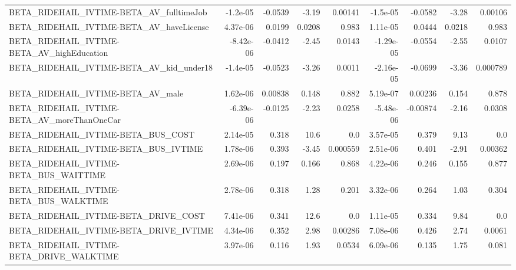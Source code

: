 \begin{tabular}{lrrrrrrrr}
BETA\_RIDEHAIL\_IVTIME-BETA\_AV\_fulltimeJob           &    -1.2e-05 &      -0.0539 &     -3.19 &  0.00141 &   -1.5e-05 &     -0.0582 &        -3.28 &       0.00106 \\
BETA\_RIDEHAIL\_IVTIME-BETA\_AV\_haveLicense           &    4.37e-06 &       0.0199 &    0.0208 &    0.983 &   1.11e-05 &      0.0444 &       0.0218 &         0.983 \\
BETA\_RIDEHAIL\_IVTIME-BETA\_AV\_highEducation         &   -8.42e-06 &      -0.0412 &     -2.45 &   0.0143 &  -1.29e-05 &     -0.0554 &        -2.55 &        0.0107 \\
BETA\_RIDEHAIL\_IVTIME-BETA\_AV\_kid\_under18           &    -1.4e-05 &      -0.0523 &     -3.26 &   0.0011 &  -2.16e-05 &     -0.0699 &        -3.36 &      0.000789 \\
BETA\_RIDEHAIL\_IVTIME-BETA\_AV\_male                  &    1.62e-06 &      0.00838 &     0.148 &    0.882 &   5.19e-07 &     0.00236 &        0.154 &         0.878 \\
BETA\_RIDEHAIL\_IVTIME-BETA\_AV\_moreThanOneCar        &   -6.39e-06 &      -0.0125 &     -2.23 &   0.0258 &  -5.48e-06 &    -0.00874 &        -2.16 &        0.0308 \\
BETA\_RIDEHAIL\_IVTIME-BETA\_BUS\_COST                 &    2.14e-05 &        0.318 &      10.6 &      0.0 &   3.57e-05 &       0.379 &         9.13 &           0.0 \\
BETA\_RIDEHAIL\_IVTIME-BETA\_BUS\_IVTIME               &    1.78e-06 &        0.393 &     -3.45 & 0.000559 &   2.51e-06 &       0.401 &        -2.91 &       0.00362 \\
BETA\_RIDEHAIL\_IVTIME-BETA\_BUS\_WAITTIME             &    2.69e-06 &        0.197 &     0.166 &    0.868 &   4.22e-06 &       0.246 &        0.155 &         0.877 \\
BETA\_RIDEHAIL\_IVTIME-BETA\_BUS\_WALKTIME             &    2.78e-06 &        0.318 &      1.28 &    0.201 &   3.32e-06 &       0.264 &         1.03 &         0.304 \\
BETA\_RIDEHAIL\_IVTIME-BETA\_DRIVE\_COST               &    7.41e-06 &        0.341 &      12.6 &      0.0 &   1.11e-05 &       0.334 &         9.84 &           0.0 \\
BETA\_RIDEHAIL\_IVTIME-BETA\_DRIVE\_IVTIME             &    4.34e-06 &        0.352 &      2.98 &  0.00286 &   7.08e-06 &       0.426 &         2.74 &        0.0061 \\
BETA\_RIDEHAIL\_IVTIME-BETA\_DRIVE\_WALKTIME           &    3.97e-06 &        0.116 &      1.93 &   0.0534 &   6.09e-06 &       0.135 &         1.75 &         0.081 \\

\end{tabular}
